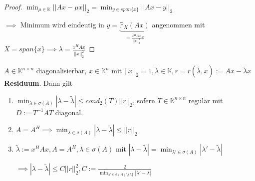 \begin{proof}
	$\min_{\mu \in \mathbb{K}} ||Ax - \mu x||_2 = \min_{y \in span\{x\}} ||Ax - y||_2$
	
	$\implies$ Minimum wird eindeutig in $y = \underbrace{\mathbb{P}_X(Ax)}_{=\frac{x^HAx}{||x||_2^2}x}$ angenommen mit $X = span\{x\} \implies \lambda = \frac{x^HAx}{||x||_2^2}$
\end{proof}

\begin{lemma}
	$A \in \mathbb{K}^{n\times n}$ diagonalisierbar, $x \in \mathbb{K}^n$ mit $||x||_2 = 1, \tilde{\lambda} \in \mathbb{K}, r=r(\tilde{\lambda}, x) := Ax - \tilde{\lambda}x$ \textbf{Residuum}. Dann gilt
	\begin{enumerate}
		\item $\min_{\lambda \in \sigma(A)} |\lambda - \tilde{\lambda}| \leq cond_2(T) ||r||_2$, sofern $T \in \mathbb{K}^{n\times n}$ regulär mit $D := T^{-1}AT$ diagonal.
		
		\item $A = A^H \implies \min_{\lambda \in \sigma(A)} |\lambda - \tilde{\lambda}| \leq ||r||_2$
		
		\item $\tilde{\lambda} := x^HAx, A=A^H, \lambda \in \sigma(A)$ mit $|\lambda - \tilde{\lambda}| = \min_{\lambda' \in \sigma(A)} |\lambda' - \tilde{\lambda}|$
		
		$\implies |\lambda - \tilde{\lambda}| \leq C ||r||_2^2, C := \frac{2}{\min_{\lambda' \in \sigma(A) \setminus \{\lambda\}}|\lambda' - \lambda|}$
	\end{enumerate}
\end{lemma}

